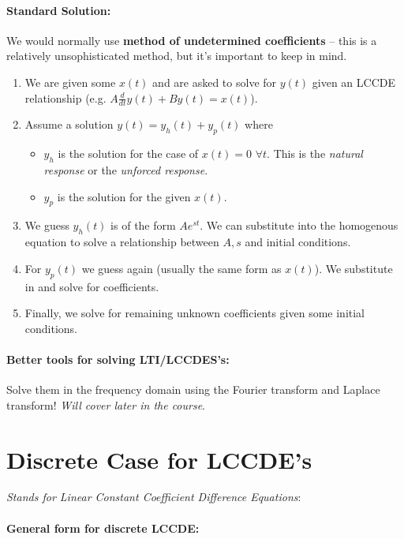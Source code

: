 \documentclass[a4paper,12pt]{report}
\begin{document}
\paragraph{Standard Solution: } We would normally use \textbf{method of undetermined coefficients} -- this is a relatively unsophisticated method, but it's important to keep in mind. 

\begin{enumerate}
\item We are given some $x(t)$ and are asked to solve for $y(t)$ given an LCCDE relationship (e.g. $A\frac{d}{dt}y(t) + B y(t) = x(t)$).
\item Assume a solution $y(t) = y_h(t) + y_p(t)$ where 
\begin{itemize} 
\item $y_h$ is the solution for the case of $x(t) = 0\,\,\forall t$. This is the \textit{natural response} or the \textit{unforced response}.
\item $y_p$ is the solution for the given $x(t)$.
\end{itemize}

\item We guess $y_h(t)$ is of the form $Ae^{st}$. We can substitute into the homogenous equation to solve a relationship between $A, s$ and initial conditions.
\item For $y_p(t)$ we guess again (usually the same form as $x(t)$). We substitute in and solve for coefficients. 
\item Finally, we solve for remaining unknown coefficients given some initial conditions.
\end{enumerate}


\paragraph{Better tools for solving LTI/LCCDES's: } Solve them in the frequency domain using the Fourier transform and Laplace transform! \textit{Will cover later in the course}.


\section{Discrete Case for LCCDE's}

\textit{Stands for Linear Constant Coefficient Difference Equations}: 

\paragraph{General form for discrete LCCDE: } 
\end{document}
